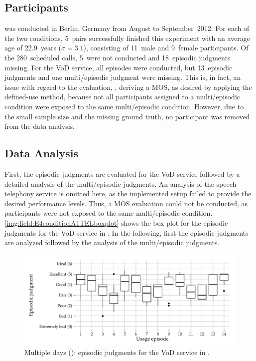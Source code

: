 \subsection{Participants}
 was conducted in Berlin, Germany from August to September~2012.
For each of the two conditions, 5~pairs successfully finished this experiment with an average age of 22.9~years ($\sigma = 3.1$), consisting of 11~male and 9~female participants.
Of the 280~scheduled calls, 5~were not conducted and 18~episodic judgments missing.
For the \ac{VoD} service, all episodes were conducted, but 13~episodic judgments and one multi\-/episodic judgment were missing.
This is, in fact, an issue with regard to the evaluation, \ie, deriving a \ac{MOS}, as desired by applying the defined-use method, because not all participants assigned to a multi\-/episodic condition were exposed to the same multi\-/episodic condition.
However, due to the small sample size and the missing ground truth, no participant was removed from the data analysis.

\subsection{Data Analysis}
First, the episodic judgments are evaluated for the \ac{VoD} service followed by a detailed analysis of the multi\-/episodic judgments.
An analysis of the speech telephony service is omitted here, as the implemented setup failed to provide the desired performance levels. 
Thus, a \ac{MOS} evaluation could not be conducted, as participants were not exposed to the same multi\-/episodic condition.
\autoref{img:field:E4conditionA1TELboxplot} shows the box plot for the episodic judgments for the \ac{VoD} service in .
In the following, first the episodic judgments are analyzed followed by the analysis of the multi\-/episodic judgments.

\begin{figure}
	\centering
\begin{knitrout}
\color{fgcolor}
\includegraphics[width=\maxwidth]{figure/plotE4C0-1} 

\end{knitrout}
	\caption{Multiple days (): episodic judgments for the \ac{VoD} service in .}
	\label{img:field:E4conditionA1TELboxplot}
\end{figure}

